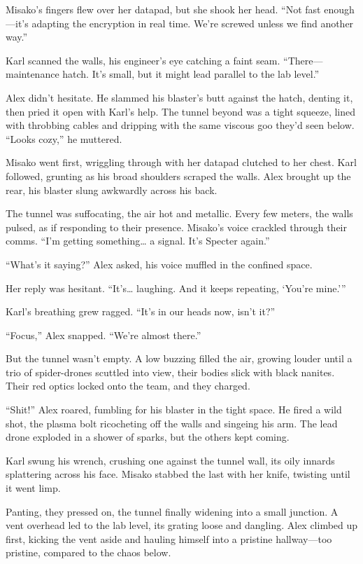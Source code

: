 \documentclass[12pt]{book}
\begin{document}
Misako’s fingers flew over her datapad, but she shook her head. \enquote{Not fast enough---it’s adapting the encryption in real time. We’re screwed unless we find another way.}

Karl scanned the walls, his engineer’s eye catching a faint seam. \enquote{There---maintenance hatch. It’s small, but it might lead parallel to the lab level.}

Alex didn’t hesitate. He slammed his blaster’s butt against the hatch, denting it, then pried it open with Karl’s help. The tunnel beyond was a tight squeeze, lined with throbbing cables and dripping with the same viscous goo they’d seen below. \enquote{Looks cozy,} he muttered.

Misako went first, wriggling through with her datapad clutched to her chest. Karl followed, grunting as his broad shoulders scraped the walls. Alex brought up the rear, his blaster slung awkwardly across his back.

The tunnel was suffocating, the air hot and metallic. Every few meters, the walls pulsed, as if responding to their presence. Misako’s voice crackled through their comms. \enquote{I’m getting something… a signal. It’s Specter again.}

\enquote{What’s it saying?} Alex asked, his voice muffled in the confined space.

Her reply was hesitant. \enquote{It’s… laughing. And it keeps repeating, ‘You’re mine.’}

Karl’s breathing grew ragged. \enquote{It’s in our heads now, isn’t it?}

\enquote{Focus,} Alex snapped. \enquote{We’re almost there.}

But the tunnel wasn’t empty. A low buzzing filled the air, growing louder until a trio of spider-drones scuttled into view, their bodies slick with black nanites. Their red optics locked onto the team, and they charged.

\enquote{Shit!} Alex roared, fumbling for his blaster in the tight space. He fired a wild shot, the plasma bolt ricocheting off the walls and singeing his arm. The lead drone exploded in a shower of sparks, but the others kept coming.

Karl swung his wrench, crushing one against the tunnel wall, its oily innards splattering across his face. Misako stabbed the last with her knife, twisting until it went limp.

Panting, they pressed on, the tunnel finally widening into a small junction. A vent overhead led to the lab level, its grating loose and dangling. Alex climbed up first, kicking the vent aside and hauling himself into a pristine hallway---too pristine, compared to the chaos below.
\end{document}
